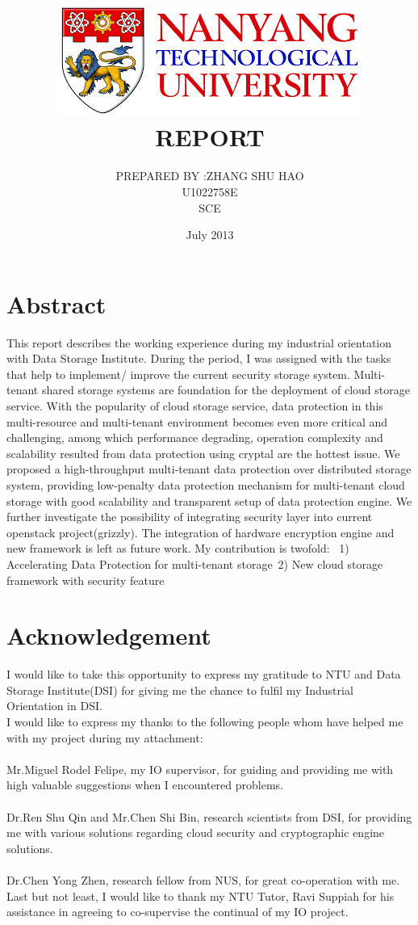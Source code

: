 \documentclass[10pt]{report}
\title{
       \includegraphics {ntu_log}
       REPORT 
        \center{ON 
        \center{INDUSTRIAL ORIENTATION 
        \center{WITH 
        \center{DATA STORAGE INSTITUTE
        }}}}}
\author{
        PREPARED BY :ZHANG SHU HAO\\
        \qquad\qquad U1022758E\\
        \quad        SCE
        }
\date{\qquad \qquad 11 July 2013}
\begin{document}
		
	\maketitle
	\newpage
	\chapter*{Abstract}
		This report describes the working experience during my industrial orientation with Data Storage Institute. 
		During the period, I was assigned with the tasks that help to implement/ improve the current security storage system.
		Multi-tenant shared storage systems are foundation for the deployment of cloud storage service. With the popularity of cloud storage service, data protection in this multi-resource and multi-tenant environment becomes even more critical and challenging, among which performance degrading, operation complexity and scalability resulted from data protection using cryptal are the hottest issue. We proposed a high-throughput multi-tenant data protection over distributed storage system, providing low-penalty data protection mechanism for multi-tenant cloud storage with good scalability and transparent setup of data protection engine. 
		We further investigate the possibility of integrating security layer into current openstack project(grizzly). The integration of hardware encryption engine and new framework is left as future work.
		My contribution is twofold: \ 1) Accelerating Data Protection for multi-tenant storage\ 2) New cloud storage framework with security feature
	\newpage
	\chapter*{Acknowledgement}
		I would like to take this opportunity to express my gratitude to NTU and Data Storage Institute(DSI) for giving me the chance to fulfil my Industrial Orientation in DSI.\\
		I would like to express my thanks to the following people whom have helped me with my project during my attachment:\\\\
		Mr.Miguel Rodel Felipe, my IO supervisor, for guiding and providing me with high valuable suggestions when I encountered problems.\\\\
		Dr.Ren Shu Qin and Mr.Chen Shi Bin, research scientists from DSI, for providing me with various solutions regarding cloud security and cryptographic engine solutions.\\\\
		Dr.Chen Yong Zhen, research fellow from NUS, for great co-operation with me.
		Last but not least, I would like to thank my NTU Tutor, Ravi Suppiah for his assistance in agreeing to co-supervise the continual of my IO project.
	\newpage
	\tableofcontents
	\newpage
	\listoffigures
	\newpage
	
\end{document}
